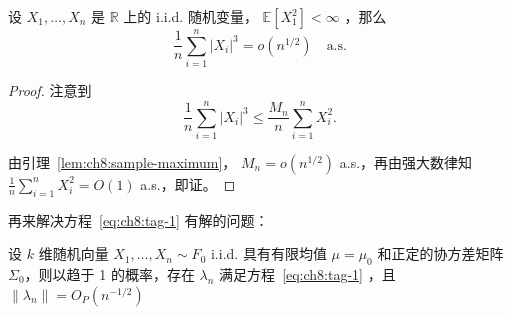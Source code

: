 \begin{lemma}[三阶样本矩的阶]\label{lem:ch8:third-sample-moment}

设 $X_1,\dots,X_n$ 是 $\mathbb R$ 上的 i.i.d. 随机变量， $\mathbb E[X_1^2]<\infty$ ，那么
\[
\frac1n\sum_{i=1}^n|X_i|^3=o(n^{1/2})\quad \text{a.s.}
\]

\end{lemma}

\begin{proof}

注意到
\[
\frac1n\sum_{i=1}^n|X_i|^3\le \frac{M_n}{n}\sum_{i=1}^nX_i^2.
\]

由引理~\ref{lem:ch8:sample-maximum}， $M_n=o(n^{1/2})$ a.s.，再由强大数律知 $\frac1n\sum_{i=1}^nX_i^2=O(1)$ a.s.，即证。

\end{proof}

再来解决方程~\eqref{eq:ch8:tag-1} 有解的问题：

\begin{lemma}[经验似然乘子的存在性]\label{lem:ch8:multiplier-existence}

设 $k$ 维随机向量 $X_1,\dots,X_n\sim F_0$ i.i.d. 具有有限均值 $\mu=\mu_0$ 和正定的协方差矩阵 $\Sigma_0$，则以趋于 1 的概率，存在 $\lambda_n$ 满足方程~\eqref{eq:ch8:tag-1} ，且 $\|\lambda_n\|=O_P(n^{-1/2})$

\end{lemma}

